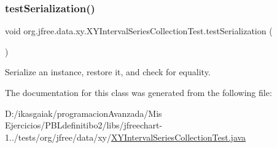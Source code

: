 \subsubsection{\texorpdfstring{test\+Serialization()}{testSerialization()}}
{\footnotesize\ttfamily void org.\+jfree.\+data.\+xy.\+X\+Y\+Interval\+Series\+Collection\+Test.\+test\+Serialization (\begin{DoxyParamCaption}{ }\end{DoxyParamCaption})}

Serialize an instance, restore it, and check for equality. 

The documentation for this class was generated from the following file\+:\begin{DoxyCompactItemize}
\item 
D\+:/ikasgaiak/programacion\+Avanzada/\+Mis Ejercicios/\+P\+B\+Ldefinitibo2/libs/jfreechart-\/1../tests/org/jfree/data/xy/\mbox{\hyperlink{_x_y_interval_series_collection_test_8java}{X\+Y\+Interval\+Series\+Collection\+Test.\+java}}\end{DoxyCompactItemize}
